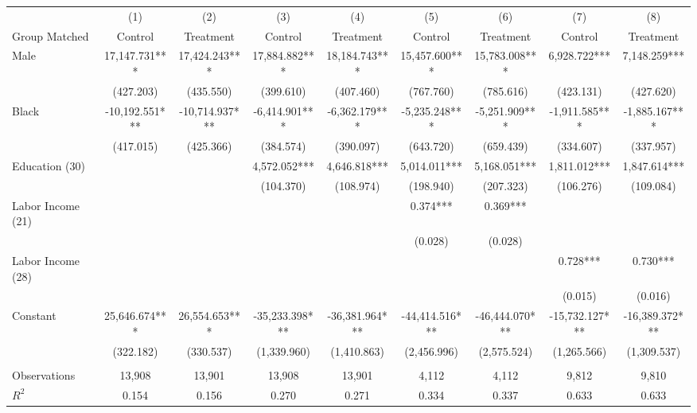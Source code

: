 \begin{tabular}{lcccccccc} \toprule
 & (1) & (2) & (3) & (4) & (5) & (6) & (7) & (8) \\ 
Group Matched & Control & Treatment & Control & Treatment & Control & Treatment & Control & Treatment \\ \midrule
Male & 17,147.731*** & 17,424.243*** & 17,884.882*** & 18,184.743*** & 15,457.600*** & 15,783.008*** & 6,928.722*** & 7,148.259*** \\
 & (427.203) & (435.550) & (399.610) & (407.460) & (767.760) & (785.616) & (423.131) & (427.620) \\
Black & -10,192.551*** & -10,714.937*** & -6,414.901*** & -6,362.179*** & -5,235.248*** & -5,251.909*** & -1,911.585*** & -1,885.167*** \\
 & (417.015) & (425.366) & (384.574) & (390.097) & (643.720) & (659.439) & (334.607) & (337.957) \\
Education (30) &  &  & 4,572.052*** & 4,646.818*** & 5,014.011*** & 5,168.051*** & 1,811.012*** & 1,847.614*** \\
 &  &  & (104.370) & (108.974) & (198.940) & (207.323) & (106.276) & (109.084) \\
Labor Income (21) &  &  &  &  & 0.374*** & 0.369*** &  &  \\
 &  &  &  &  & (0.028) & (0.028) &  &  \\
Labor Income (28) &  &  &  &  &  &  & 0.728*** & 0.730*** \\
 &  &  &  &  &  &  & (0.015) & (0.016) \\
Constant & 25,646.674*** & 26,554.653*** & -35,233.398*** & -36,381.964*** & -44,414.516*** & -46,444.070*** & -15,732.127*** & -16,389.372*** \\
 & (322.182) & (330.537) & (1,339.960) & (1,410.863) & (2,456.996) & (2,575.524) & (1,265.566) & (1,309.537) \\ \\ \midrule
Observations & 13,908 & 13,901 & 13,908 & 13,901 & 4,112 & 4,112 & 9,812 & 9,810 \\
$R^2$ & 0.154 & 0.156 & 0.270 & 0.271 & 0.334 & 0.337 & 0.633 & 0.633 \\ \toprule
\end{tabular}
